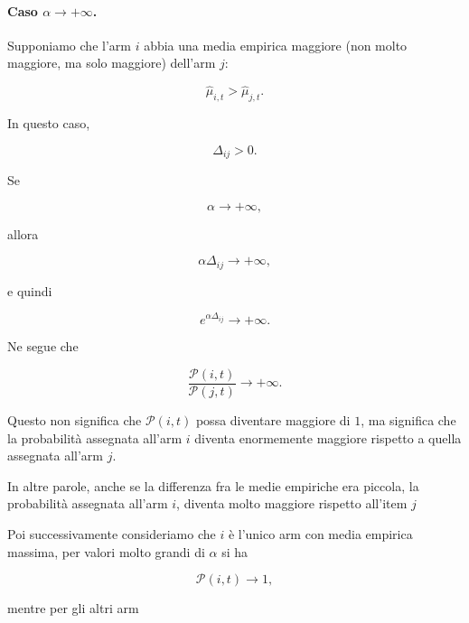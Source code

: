 \paragraph{Caso $\alpha \to +\infty$.}

Supponiamo che l'arm $i$ abbia una media empirica maggiore (non molto maggiore, ma solo maggiore) dell'arm $j$:

\[
\widehat{\mu}_{i,t}
>
\widehat{\mu}_{j,t}.
\]

In questo caso,

\[
\Delta_{ij}>0.
\]

Se

\[
\alpha\to+\infty,
\]

allora

\[
\alpha\Delta_{ij}
\to+\infty,
\]

e quindi

\[
e^{\alpha\Delta_{ij}}
\to+\infty.
\]

Ne segue che

\[
\frac{\mathcal{P}(i,t)}{\mathcal{P}(j,t)}
\to+\infty.
\]

Questo non significa che $\mathcal{P}(i,t)$ possa diventare maggiore di $1$, ma significa che la probabilità assegnata all'arm $i$ diventa enormemente maggiore rispetto a quella assegnata all'arm $j$.

In altre parole, anche se la differenza fra le medie empiriche era piccola, la probabilità assegnata all'arm $i$, diventa molto maggiore rispetto all'item $j$

Poi successivamente consideriamo che $i$ è l'unico arm con media empirica massima, per valori molto grandi di $\alpha$ si ha

\[
\mathcal{P}(i,t)\to 1,
\]

mentre per gli altri arm

